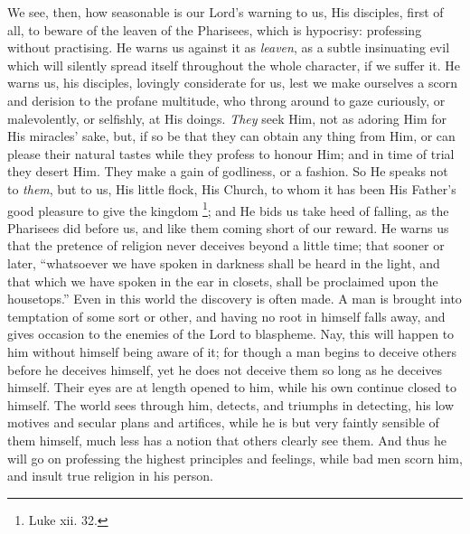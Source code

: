 We see, then, how seasonable is our Lord's warning to
us, His disciples, first of all, to beware of the leaven
of the Pharisees, which is hypocrisy: professing without
practising. He warns us against it as \emph{leaven}, as a
subtle insinuating evil which will silently spread itself
throughout the whole character, if we suffer it. He warns
us, his disciples, lovingly considerate for us, lest we
make ourselves a scorn and derision to the profane
multitude, who throng around to gaze curiously, or
malevolently, or selfishly, at His doings. \emph{They}
seek Him, not as adoring Him for His miracles' sake, but,
if so be that they can obtain any thing from Him, or can
please their natural tastes while they profess to honour
Him; and in time of trial they desert Him. They make a
gain of godliness, or a fashion. So He speaks not to \emph{them},
but to us, His little flock, His Church, to whom it has
been His Father's good pleasure to give the kingdom \footnote{Luke
xii. 32.}; and He bids us take heed of falling, as the
Pharisees did before us, and like them coming short of
our reward. He warns us that the pretence of religion
never deceives beyond a little time; that sooner or
later, ``whatsoever we have spoken in darkness shall
be heard in the light, and that which we have spoken in
the ear in closets, shall be proclaimed upon the
housetops.'' Even in this world the discovery is
often made. A man is brought into temptation of some sort
or other, and having no root in himself falls away, and
gives occasion to the enemies of the Lord to blaspheme.
Nay, this will happen to him without himself being aware
of it; for though a man begins to deceive others before
he deceives himself, yet he does not deceive them so long
as he deceives himself. Their eyes are at length opened
to him, while his own continue closed to himself. The
world sees through him, detects, and triumphs in
detecting, his low motives and secular plans and
artifices, while he is but very faintly sensible of them
himself, much less has a notion that others clearly see
them. And thus he will go on professing the highest
principles and feelings, while bad men scorn him, and
insult true religion in his person.

